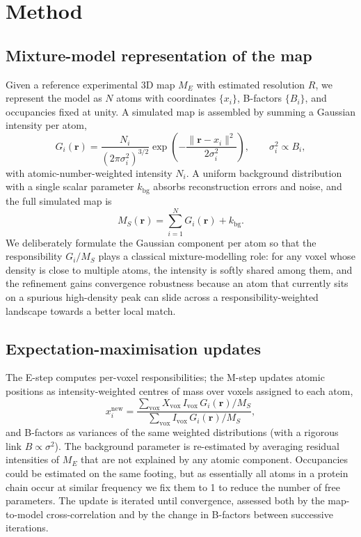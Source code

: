 \documentclass[11pt]{article}
\begin{document}
\section{Method}

\subsection{Mixture-model representation of the map}
Given a reference experimental 3D map $M_{E}$ with estimated resolution $R$, we represent the model as $N$ atoms with coordinates $\{x_{i}\}$, B-factors $\{B_{i}\}$, and occupancies fixed at unity. A simulated map is assembled by summing a Gaussian intensity per atom,
\[ G_{i}(\mathbf{r}) = \frac{N_{i}}{(2\pi\sigma_{i}^{2})^{3/2}} \exp\left(-\frac{\|\mathbf{r}-x_{i}\|^{2}}{2\sigma_{i}^{2}}\right),\qquad \sigma_{i}^{2} \propto B_{i}, \]
with atomic-number-weighted intensity $N_{i}$. A uniform background distribution with a single scalar parameter $k_{\mathrm{bg}}$ absorbs reconstruction errors and noise, and the full simulated map is
\[ M_{S}(\mathbf{r}) = \sum_{i=1}^{N} G_{i}(\mathbf{r}) + k_{\mathrm{bg}}. \]
We deliberately formulate the Gaussian component per atom so that the responsibility $G_{i}/M_{S}$ plays a classical mixture-modelling role: for any voxel whose density is close to multiple atoms, the intensity is softly shared among them, and the refinement gains convergence robustness because an atom that currently sits on a spurious high-density peak can slide across a responsibility-weighted landscape towards a better local match.

\subsection{Expectation-maximisation updates}
The E-step computes per-voxel responsibilities; the M-step updates atomic positions as intensity-weighted centres of mass over voxels assigned to each atom,
\[ x_{i}^{\mathrm{new}} = \frac{\sum_{\mathrm{vox}} X_{\mathrm{vox}}\, I_{\mathrm{vox}}\, G_{i}(\mathbf{r})/M_{S}}{\sum_{\mathrm{vox}} I_{\mathrm{vox}}\, G_{i}(\mathbf{r})/M_{S}}, \]
and B-factors as variances of the same weighted distributions (with a rigorous link $B \propto \sigma^{2}$). The background parameter is re-estimated by averaging residual intensities of $M_{E}$ that are not explained by any atomic component. Occupancies could be estimated on the same footing, but as essentially all atoms in a protein chain occur at similar frequency we fix them to 1 to reduce the number of free parameters. The update is iterated until convergence, assessed both by the map-to-model cross-correlation and by the change in B-factors between successive iterations.
\end{document}
